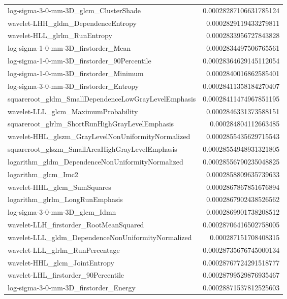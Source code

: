 {\begin{xltabular}[H]{\textwidth}{X r}
        log-sigma-3-0-mm-3D\_glcm\_ClusterShade & 0.00028287106631785124 \\
        wavelet-LHH\_gldm\_DependenceEntropy & 0.0002829119433279811 \\
        wavelet-HLL\_glrlm\_RunEntropy & 0.0002833956727843828 \\
        log-sigma-1-0-mm-3D\_firstorder\_Mean & 0.0002834497506765561 \\
        log-sigma-1-0-mm-3D\_firstorder\_90Percentile & 0.00028364629145112054 \\
        log-sigma-1-0-mm-3D\_firstorder\_Minimum & 0.0002840016862585401 \\
        log-sigma-3-0-mm-3D\_firstorder\_Entropy & 0.00028411358184270407 \\
        squareroot\_gldm\_SmallDependenceLowGrayLevelEmphasis & 0.00028411474967851195 \\
        wavelet-LLL\_glcm\_MaximumProbability & 0.0002846331373588151 \\
        squareroot\_glrlm\_ShortRunHighGrayLevelEmphasis & 0.000284804112663485 \\
        wavelet-HHL\_glszm\_GrayLevelNonUniformityNormalized & 0.0002855435629715543 \\
        squareroot\_glszm\_SmallAreaHighGrayLevelEmphasis & 0.00028554948931321805 \\
        logarithm\_gldm\_DependenceNonUniformityNormalized & 0.00028556790235048825 \\
        logarithm\_glcm\_Imc2 & 0.0002858809635739633 \\
        wavelet-HHL\_glcm\_SumSquares & 0.0002867867851676894 \\
        logarithm\_glrlm\_LongRunEmphasis & 0.0002867902438526562 \\
        log-sigma-3-0-mm-3D\_glcm\_Idmn & 0.0002869901738208512 \\
        wavelet-LLH\_firstorder\_RootMeanSquared & 0.00028706416502758005 \\
        wavelet-LLL\_gldm\_DependenceNonUniformityNormalized & 0.000287151708408315 \\
        wavelet-LLL\_glrlm\_RunPercentage & 0.00028735676745000134 \\
        wavelet-HHL\_glcm\_JointEntropy & 0.00028767724291518777 \\
        wavelet-LHL\_firstorder\_90Percentile & 0.00028799529876935467 \\
        log-sigma-3-0-mm-3D\_firstorder\_Energy & 0.00028871537812525603 \\

\end{xltabular}}
